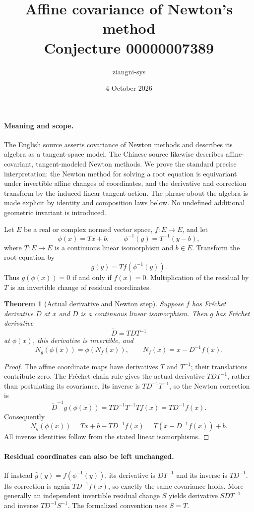 \documentclass[11pt]{article}
\title{Affine covariance of Newton's method\\Conjecture 00000007389}
\author{ziangni-sys}
\date{4 October 2026}
\newtheorem{theorem}{Theorem}
\begin{document}
\maketitle
\paragraph{Meaning and scope.}
The English source asserts covariance of Newton methods and describes its algebra as a tangent-space model. The Chinese source likewise describes affine-covariant, tangent-modeled Newton methods. We prove the standard precise interpretation: the Newton method for solving a root equation is equivariant under invertible affine changes of coordinates, and the derivative and correction transform by the induced linear tangent action. The phrase about the algebra is made explicit by identity and composition laws below. No undefined additional geometric invariant is introduced.

Let $E$ be a real or complex normed vector space, $f:E\to E$, and let
\[
 \phi(x)=Tx+b,\qquad \phi^{-1}(y)=T^{-1}(y-b),
\]
where $T:E\to E$ is a continuous linear isomorphism and $b\in E$.
Transform the root equation by
\[
 g(y)=T f(\phi^{-1}(y)).
\]
Thus $g(\phi(x))=0$ if and only if $f(x)=0$. Multiplication of the residual by $T$ is an invertible change of residual coordinates.

\begin{theorem}[Actual derivative and Newton step]
Suppose $f$ has Fr\'echet derivative $D$ at $x$ and $D$ is a continuous linear isomorphism. Then $g$ has Fr\'echet derivative
\[
 \widetilde D=TDT^{-1}
\]
at $\phi(x)$, this derivative is invertible, and
\[
 N_g(\phi(x))=\phi(N_f(x)),\qquad
 N_f(x)=x-D^{-1}f(x).
\]
\end{theorem}
\begin{proof}
The affine coordinate maps have derivatives $T$ and $T^{-1}$; their translations contribute zero. The Fr\'echet chain rule gives the actual derivative $TDT^{-1}$, rather than postulating its covariance. Its inverse is $TD^{-1}T^{-1}$, so the Newton correction is
\[
 \widetilde D^{-1}g(\phi(x))
   =TD^{-1}T^{-1}Tf(x)=TD^{-1}f(x).
\]
Consequently
\[
 N_g(\phi(x))=Tx+b-TD^{-1}f(x)
            =T(x-D^{-1}f(x))+b.
\]
All inverse identities follow from the stated linear isomorphisms.
\end{proof}

\paragraph{Residual coordinates can also be left unchanged.}
If instead $\widehat g(y)=f(\phi^{-1}(y))$, its derivative is $DT^{-1}$ and its inverse is $TD^{-1}$. Its correction is again $TD^{-1}f(x)$, so exactly the same covariance holds. More generally an independent invertible residual change $S$ yields derivative $SDT^{-1}$ and inverse $TD^{-1}S^{-1}$. The formalized convention uses $S=T$.
\end{document}
